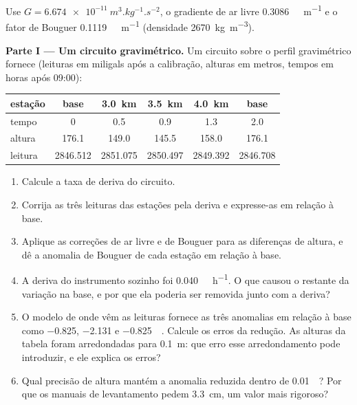 \begin{problem}
\label{pb:b3:field-lab-methods-3:1}
Use $G = \qty{6.674e-11}{m^3.kg^{-1}.s^{-2}}$, o gradiente de ar livre
\qty{0.3086}{\milli\gal.m^{-1}} e o fator de Bouguer
\qty{0.1119}{\milli\gal.m^{-1}} (densidade \qty{2670}{kg.m^{-3}}).

\medskip\noindent\textbf{Parte I --- Um circuito gravimétrico.} Um circuito sobre o
perfil gravimétrico fornece (leituras em miligals após a calibração, alturas
em metros, tempos em horas após 09:00):
\begin{center}
\small
\begin{tabular}{lccccc}
\hline
estação & base & \qty{3.0}{km} & \qty{3.5}{km} & \qty{4.0}{km} & base \\
\hline
tempo & 0 & 0.5 & 0.9 & 1.3 & 2.0 \\
altura & 176.1 & 149.0 & 145.5 & 158.0 & 176.1 \\
leitura & 2846.512 & 2851.075 & 2850.497 & 2849.392 & 2846.708 \\
\hline
\end{tabular}
\end{center}
\begin{enumerate}
\item Calcule a taxa de deriva do circuito.
\item Corrija as três leituras das estações pela deriva e expresse-as
  em relação à base.
\item Aplique as correções de ar livre e de Bouguer para as
  diferenças de altura, e dê a anomalia de Bouguer de cada estação em relação à
  base.
\item A deriva do instrumento sozinho foi \qty{0.040}{\milli\gal.h^{-1}}.
  O que causou o restante da variação na base, e por que ela poderia ser
  removida junto com a deriva?
\item O modelo de onde vêm as leituras fornece as três anomalias
  em relação à base como \num{-0.825}, \num{-2.131} e
  \qty{-0.825}{\milli\gal}. Calcule os erros da redução. As
  alturas da tabela foram arredondadas para \qty{0.1}{m}: que erro esse
  arredondamento pode introduzir, e ele explica os erros?
\item Qual precisão de altura mantém a anomalia reduzida dentro de
  \qty{0.01}{\milli\gal}? Por que os manuais de levantamento pedem
  \qty{3.3}{cm}, um valor mais rigoroso?
\end{enumerate}


\end{problem}
